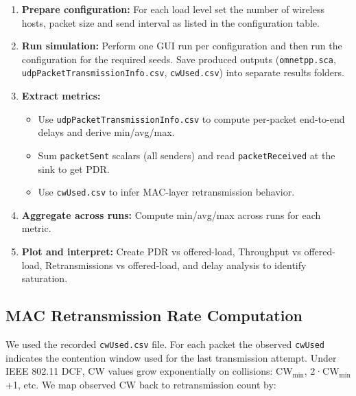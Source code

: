 \documentclass{article}
\begin{document}
\begin{enumerate}

  \item \textbf{Prepare configuration:} For each load level set the number of wireless hosts, packet size and send interval as listed in the configuration table.

  \item \textbf{Run simulation:} Perform one GUI run per configuration and then run the configuration for the required seeds. Save produced outputs (\texttt{omnetpp.sca}, \texttt{udpPacketTransmissionInfo.csv}, \texttt{cwUsed.csv}) into separate results folders.

  \item \textbf{Extract metrics:}

    \begin{itemize}

      \item Use \texttt{udpPacketTransmissionInfo.csv} to compute per-packet end-to-end delays and derive min/avg/max.

      \item Sum \texttt{packetSent} scalars (all senders) and read \texttt{packetReceived} at the sink to get PDR.

      \item Use \texttt{cwUsed.csv} to infer MAC-layer retransmission behavior.

    \end{itemize}

  \item \textbf{Aggregate across runs:} Compute min/avg/max across runs for each metric.

  \item \textbf{Plot and interpret:} Create PDR vs offered-load, Throughput vs offered-load, Retransmissions vs offered-load, and delay analysis to identify saturation.

\end{enumerate}

\subsection{MAC Retransmission Rate Computation}

We used the recorded \texttt{cwUsed.csv} file. For each packet the observed \texttt{cwUsed} indicates the contention window used for the last transmission attempt. Under IEEE 802.11 DCF, CW values grow exponentially on collisions: CW$_{\text{min}}$, 2·CW$_{\text{min}}$+1, etc. We map observed CW back to retransmission count by:
\end{document}
